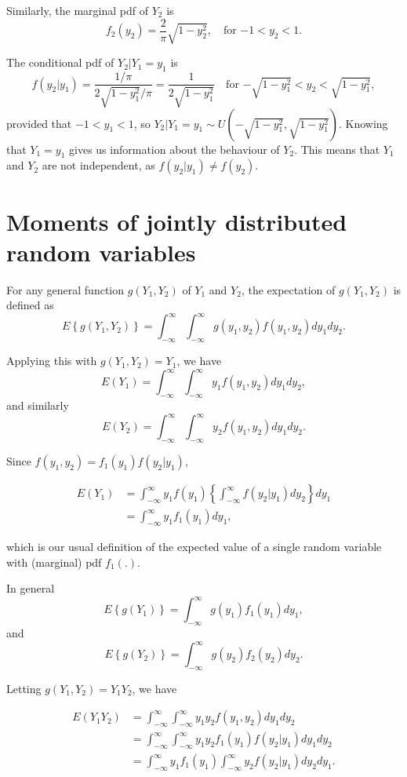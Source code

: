 \documentclass[]{book}
\theoremstyle{definition}
\theoremstyle{definition}
\theoremstyle{definition}
\theoremstyle{remark}
\begin{document}
Similarly, the marginal pdf of \(Y_2\) is
\[f_2(y_2) = \frac{2}{\pi} \sqrt{1 - y_2^2}, \quad \text{for $-1 < y_2 < 1$.}\]

The conditional pdf of \(Y_2 | Y_1 = y_1\) is
\[f(y_2 | y_1) = \frac{1/\pi}{2\sqrt{1 - y_1^2}/\pi} 
= \frac{1}{2\sqrt{1 - y_1^2}} \quad 
\text{for $-\sqrt{1 - y_1^2} < y_2 < \sqrt{1 - y_1^2}$},\] provided that
\(-1 < y_1 < 1\), so
\(Y_2 | Y_1 = y_1 \sim U(-\sqrt{1 - y_1^2}, \sqrt{1 - y_1^2}).\) Knowing
that \(Y_1 = y_1\) gives us information about the behaviour of \(Y_2\).
This means that \(Y_1\) and \(Y_2\) are not independent, as
\(f(y_2 | y_1) \not = f(y_2).\)

\section{Moments of jointly distributed random
variables}\label{moments-of-jointly-distributed-random-variables}

For any general function \(g(Y_1, Y_2)\) of \(Y_1\) and \(Y_2\), the
expectation of \(g(Y_1, Y_2)\) is defined as
\[E\left\{g(Y_1, Y_2)\right\}
= \int_{-\infty}^\infty \int_{-\infty}^\infty g(y_1, y_2) f(y_1, y_2) dy_1 dy_2. \]

Applying this with \(g(Y_1, Y_2) = Y_1\), we have
\[E(Y_1) = \int_{-\infty}^\infty \int_{-\infty}^\infty y_1 f(y_1, y_2) dy_1 dy_2,\]
and similarly
\[E(Y_2) = \int_{-\infty}^\infty \int_{-\infty}^\infty y_2 f(y_1, y_2) dy_1 dy_2.\]

Since \(f(y_1, y_2) = f_1(y_1) f(y_2 | y_1)\),

\begin{align*}
E(Y_1) &= \int_{-\infty}^\infty y_1 f(y_1) \left\{\int_{-\infty}^\infty  f(y_2 | y_1) dy_2 \right\} dy_1 \\
&= \int_{-\infty}^\infty y_1 f_1(y_1)  dy_1,
\end{align*}

which is our usual definition of the expected value of a single random
variable with (marginal) pdf \(f_1(.)\).

In general
\[E\left\{g(Y_1)\right\} = \int_{-\infty}^\infty g(y_1) f_1(y_1)  dy_1,\]
and
\[E\left\{g(Y_2)\right\} = \int_{-\infty}^\infty g(y_2) f_2(y_2)  dy_2.\]

Letting \(g(Y_1, Y_2) = Y_1 Y_2\), we have

\begin{align*}
E(Y_1 Y_2) &= \int_{-\infty}^\infty \int_{-\infty}^\infty y_1 y_2 f(y_1, y_2) dy_1 dy_2 \\
&= \int_{-\infty}^\infty \int_{-\infty}^\infty y_1 y_2 f_1(y_1) f(y_2| y_1) dy_1 dy_2 \\
&= \int_{-\infty}^\infty y_1 f_1(y_1) \int_{-\infty}^\infty y_2 f(y_2 | y_1) dy_2 dy_1.
\end{align*}
\end{document}
